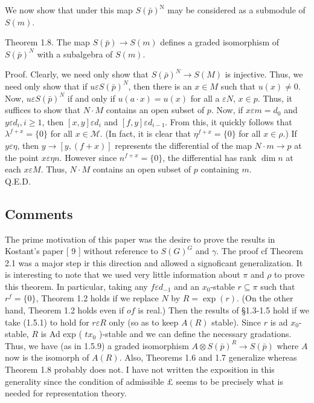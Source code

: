\documentclass[10pt]{article}
\begin{document}
We now show that under this map $S(\bar{p})^{\mathrm{N}}$ may be considered as a submodule of $S(m)$.

Theorem 1.8. The map $S(\bar{p}) \rightarrow S(m)$ defines a graded isomorphism of $S(\bar{p})^{N}$ with a subalgebra of $S(m)$.

Proof. Clearly, we need only show that $S(\bar{\rho})^{N} \rightarrow S(M)$ is injective. Thus, we need only show that if $u \varepsilon S(\bar{p})^{N}$, then there is an $x \in M$ such that $u(x) \neq 0$. Now, $u \varepsilon S(\bar{p})^{N}$ if and only if $u(a \cdot x)=u(x)$ for all a $\varepsilon N$, $x \in p$. Thus, it suffices to show that $N \cdot M$ contains an open subset of $p$. Now, if $x \varepsilon m=d_{0}$ and $y \varepsilon d_{i}, i \geq 1$, then $[x, y] \varepsilon d_{i}$ and $[f, y] \varepsilon d_{i-1}$. From this, it quickly follows that $\lambda^{f+x}=\{0\}$ for all $x \in \mathcal{M}$. (In fact, it is clear that $\eta^{f+x}=\{0\}$ for all $x \in \rho$.) If $y \varepsilon \eta$, then $y \rightarrow[y,(f+x)]$ represents the differential of the map $N \cdot m \rightarrow p$ at the point $x \varepsilon \eta n$. However since $n^{f+x}=\{0\}$, the differential has rank $\operatorname{dim} n$ at each $x \varepsilon M$. Thus, $N \cdot M$ contains an open subset of $p$ containing $m$.\\
Q.E.D.

\subsection{Comments}
The prime motivation of this paper was the desire to prove the results in Kostant's paper [ 9 ] without reference to $S(G)^{G}$ and $\gamma$. The proof cf Theorem 2.1 was a major step ir this direction and allowed a signoficant generalization. It is interesting to note that we used very little information about $\pi$ and $\rho$ to prove this theorem. In particular, taking any $f \varepsilon d_{-1}$ and an $x_{0}$-stable $r \subseteq \pi$ such that $r^{f}=\{0\}$, Theorem 1.2 holds if we replace $N$ by $R=\exp (r)$. (On the other hand, Theorem 1.2 holds even if $o f$ is real.) Then the results of §1.3-1.5 hold if we take (1.5.1) to hold for $r \varepsilon R$ only (so as to keep $A(R)$ stable). Since $r$ is ad $x_{0}$-stable, $R$ is Ad exp ( $t x_{0}$ )-stable and we can define the necessary gradations. Thus, we have (as in 1.5.9) a graded isomorphism $A \otimes S(\bar{p})^{R} \rightarrow S(\bar{p})$ where $A$ now is the isomorph of $A(R)$. Also, Theorems 1.6 and 1.7 generalize whereas Theorem 1.8 probably does not. I have not written the exposition in this generality since the condition of admissible $\pounds$ seems to be precisely what is needed for representation theory.
\end{document}
